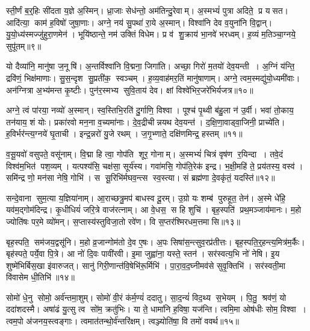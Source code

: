 स्ती॒र्णं ब॒र्॒हिः सी॑दता य॒ज्ञे अ॒स्मिन्।
ध्रा॒जाः सेध॑न्तो॒ अम॑तिन्दु॒रेवाम्।
अ॒स्मभ्यं॑ पुत्रा अदिते॒ प्र यसत।
आदि॑त्या॒ काम॑ ह॒विषो॑ जुषा॒णाः।
अग्ने॒ नय॑ सु॒पथा॑ रा॒ये अ॒स्मान्।
विश्वा॑नि देव व॒युना॑नि वि॒द्वान्।
यु॒यो॒ध्य॑स्मज्जु॑हुरा॒णमेन॑।
भूयि॑ष्ठान्ते॒ नम॑ उक्तिं विधेम।
प्र व॑ शु॒क्राय॑ भा॒नवे॑ भरध्वम्।
ह॒व्यं म॒तिञ्चा॒ग्नये॒ सुपू॑तम्॥९॥

यो दैव्या॑नि॒ मानु॑षा ज॒नूषि॑।
अ॒न्तर्विश्वा॑नि वि॒द्मना॒ जिगा॑ति।
अच्छा॒ गिरो॑ म॒तयो॑ देव॒यन्ती।
अ॒ग्निं य॑न्ति॒ द्रवि॑णं॒ भिक्ष॑माणाः।
सु॒स॒न्दृश सु॒प्रती॑क॒ स्वञ्चम्।
ह॒व्य॒वाह॑मर॒तिं मानु॑षाणाम्।
अग्ने॒ त्वम॒स्मद्यु॑यो॒ध्यमी॑वाः।
अन॑ग्नित्रा अ॒भ्य॑मन्त कृ॒ष्टीः।
पुन॑र॒स्मभ्य सुवि॒ताय॑ देव।
क्षां विश्वे॑भिर॒जरे॑भिर्यजत्र॥१०॥

अग्ने॒ त्वं पा॑रया॒ नव्यो॑ अ॒स्मान्।
स्व॒स्तिभि॒रति॑ दु॒र्गाणि॒ विश्वा।
पूश्च॑ पृ॒थ्वी ब॑हु॒ला न॑ उ॒र्वी।
भवा॑ तो॒काय॒ तन॑याय॒ शं योः।
प्रका॑रवो मन॒ना व॒च्यमा॑नाः।
दे॒व॒द्रीचीन्नयथ देव॒यन्त॑।
द॒क्षि॒णा॒वाड्वा॒जिनी॒ प्राच्ये॑ति।
ह॒विर्भर॑न्त्य॒ग्नये॑ घृ॒ताची।
इन्द्र॒न्नरो॑ यु॒जे रथम्।
ज॒गृ॒भ्णाते॒ दक्षि॑णमिन्द्र॒ हस्तम्॥११॥

व॒सू॒यवो॑ वसुपते॒ वसू॑नाम्।
वि॒द्मा हि त्वा॒ गोप॑ति शूर॒ गोनाम्।
अ॒स्मभ्यं॑ चित्रं वृष॑ण र॒यिन्दा।
तवे॒दं विश्व॑म॒भित॑ पश॒व्यम्।
यत्पश्य॑सि॒ चक्ष॑सा॒ सूर्य॑स्य।
गवा॑मसि॒ गोप॑ति॒रेक॑ इन्द्र।
भ॒क्षी॒महि॑ ते॒ प्रय॑तस्य॒ वस्व॑।
समि॑न्द्र णो॒ मन॑सा नेषि॒ गोभि॑।
स सू॒रिभि॑र्मघव॒न्त्स स्व॒स्त्या।
सं ब्रह्म॑णा दे॒वकृ॑तं॒ यदस्ति॑॥१२॥

सन्दे॒वाना सुम॒त्या य॒ज्ञिया॑नाम्।
आ॒राच्छत्रु॒मप॑ बाधस्व दू॒रम्।
उ॒ग्रो यः शम्ब॑ पुरुहूत॒ तेन॑।
अ॒स्मे धे॑हि॒ यव॑म॒द्गोम॑दिन्द्र।
कृ॒धीधियं॑ जरि॒त्रे वाज॑रत्नाम्।
आ वे॒धस॒ स हि शुचि॑।
बृह॒स्पति॑ प्रथ॒मञ्जाय॑मानः।
म॒हो ज्योति॑षः पर॒मे व्यो॑मन्।
स॒प्तास्य॑स्तुविजा॒तो रवे॑ण।
वि स॒प्तर॑श्मिरधम॒त्तमासि॥१३॥

बृह॒स्पति॒ सम॑जय॒द्वसू॑नि।
म॒हो व्र॒जान्गोम॑तो दे॒व ए॒षः।
अ॒पः सिषा॑स॒न्त्सुव॒रप्र॑तीत्तः।
बृह॒स्पति॒र्॒हन्त्य॒मित्र॑म॒र्कैः।
बृह॑स्पते॒ पर्ये॒वा पि॒त्रे।
आ नो॑ दि॒वः पावी॑रवी।
इ॒मा जुह्वा॑ना॒ यस्ते॒ स्तन॑।
सर॑स्वत्य॒भि नो॑ नेषि।
इ॒य शुष्मे॑भिर्बिस॒खा इ॑वारुजत्।
सानु॑ गिरी॒णान्त॑वि॒षेभि॑रू॒र्मिभि॑।
पा॒रा॒व॒द॒घ्नीमव॑से सुवृ॒क्तिभि॑।
सर॑स्वती॒मा वि॑वासेम धी॒तिभि॑॥१४॥\anuvakamend[दे॒व॒यानैर्दे॒वाः सुपू॑तं यजत्र॒ हस्त॒मस्ति॒ तमास्यू॒र्मिभि॒र्द्वे च॑]

सोमो॑ धे॒नु सोमो॒ अर्व॑न्तमा॒शुम्।
सोमो॑ वी॒रं क॑र्म॒ण्यं॑ ददातु।
सा॒द॒न्यं॑ विद॒थ्य स॒भेयम्।
पि॒तु॒ श्रव॑णं॒ यो ददा॑शदस्मै।
अषा॑ढं यु॒त्सु त्व सो॑म॒ क्रतु॑भिः।
या ते॒ धामा॑नि ह॒विषा॒ यज॑न्ति।
त्वमि॒मा ओष॑धीः सोम॒ विश्वा।
त्वम॒पो अ॑जनय॒स्त्वङ्गाः।
त्वमात॑तन्थो॒र्व॑न्तरि॑क्षम्।
त्वञ्ज्योति॑षा॒ वि तमो॑ ववर्थ॥१५॥

